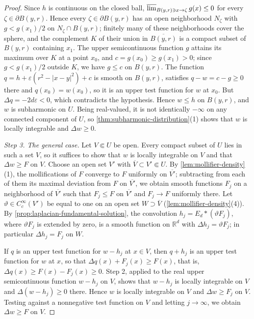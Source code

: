 \begin{proof}
Since $h$ is continuous on the closed ball, $\varlimsup_{B(y,r)\ni x\to\zeta}g(x)\le0$ for every $\zeta\in\partial B(y,r)$. Hence every $\zeta\in\partial B(y,r)$ has an open neighborhood $N_\zeta$ with $g<g(x_1)/2$ on $N_\zeta\cap B(y,r)$; finitely many of these neighborhoods cover the sphere, and the complement $K$ of their union in $\overline{B(y,r)}$ is a compact subset of $B(y,r)$ containing $x_1$. The upper semicontinuous function $g$ attains its maximum over $K$ at a point $x_0$, and $c=g(x_0)\ge g(x_1)>0$; since $g<g(x_1)/2$ outside $K$, we have $g\le c$ on $B(y,r)$. The function $q=h+\varepsilon(r^2-|x-y|^2)+c$ is smooth on $B(y,r)$, satisfies $q-w=c-g\ge0$ there and $q(x_0)=w(x_0)$, so it is an upper test function for $w$ at $x_0$. But $\Delta q=-2d\varepsilon<0$, which contradicts the hypothesis. Hence $w\le h$ on $B(y,r)$, and $w$ is subharmonic on $U$. Being real-valued, it is not identically $-\infty$ on any connected component of $U$, so \cref{thm:subharmonic-distribution}(1) shows that $w$ is locally integrable and $\Delta w\ge0$.

\emph{Step 3. The general case.} Let $V\Subset U$ be open. Every compact subset of $U$ lies in such a set $V$, so it suffices to show that $w$ is locally integrable on $V$ and that $\Delta w\ge F$ on $V$. Choose an open set $V'$ with $\overline V\subset V'\Subset U$. By \cref{lem:mollifier-density}(1), the mollifications of $F$ converge to $F$ uniformly on $\overline{V'}$; subtracting from each of them its maximal deviation from $F$ on $\overline{V'}$, we obtain smooth functions $F_j$ on a neighborhood of $\overline{V'}$ such that $F_j\le F$ on $\overline{V'}$ and $F_j\to F$ uniformly there. Let $\vartheta\in C^\infty_c(V')$ be equal to one on an open set $W\supset\overline V$ (\cref{lem:mollifier-density}(4)). By \cref{prop:laplacian-fundamental-solution}, the convolution $h_j=E_d*(\vartheta F_j)$, where $\vartheta F_j$ is extended by zero, is a smooth function on $\mathbb R^d$ with $\Delta h_j=\vartheta F_j$; in particular $\Delta h_j=F_j$ on $W$.

If $q$ is an upper test function for $w-h_j$ at $x\in V$, then $q+h_j$ is an upper test function for $w$ at $x$, so that $\Delta q(x)+F_j(x)\ge F(x)$, that is, $\Delta q(x)\ge F(x)-F_j(x)\ge0$. Step 2, applied to the real upper semicontinuous function $w-h_j$ on $V$, shows that $w-h_j$ is locally integrable on $V$ and $\Delta(w-h_j)\ge0$ there. Hence $w$ is locally integrable on $V$ and $\Delta w\ge F_j$ on $V$. Testing against a nonnegative test function on $V$ and letting $j\to\infty$, we obtain $\Delta w\ge F$ on $V$.
\end{proof}

